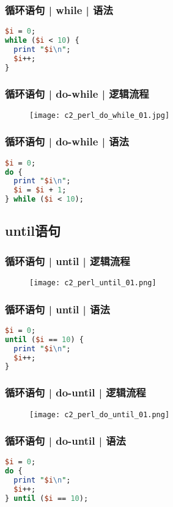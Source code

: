 \begin{frame}[fragile]
  \frametitle{循环语句 | while | \alert{语法}}
\begin{lstlisting}[language=Perl]
$i = 0;
while ($i < 10) {
  print "$i\n";
  $i++;
}
\end{lstlisting}
\end{frame}

\begin{frame}
  \frametitle{循环语句 | do-while | 逻辑流程}
  \begin{figure}
    \centering
    \texttt{[image: c2\_perl\_do\_while\_01.jpg]}
  \end{figure}
\end{frame}

\begin{frame}[fragile]
  \frametitle{循环语句 | do-while | 语法}
\begin{lstlisting}[language=Perl]
$i = 0;
do {
  print "$i\n";
  $i = $i + 1;
} while ($i < 10);
\end{lstlisting}
\end{frame}

\subsection{until语句}
\begin{frame}
  \frametitle{循环语句 | until | 逻辑流程}
  \begin{figure}
    \centering
    \texttt{[image: c2\_perl\_until\_01.png]}
  \end{figure}
\end{frame}

\begin{frame}[fragile]
  \frametitle{循环语句 | until | \alert{语法}}
\begin{lstlisting}[language=Perl]
$i = 0;
until ($i == 10) {
  print "$i\n";
  $i++;
}
\end{lstlisting}
\end{frame}

\begin{frame}
  \frametitle{循环语句 | do-until | 逻辑流程}
  \begin{figure}
    \centering
    \texttt{[image: c2\_perl\_do\_until\_01.png]}
  \end{figure}
\end{frame}

\begin{frame}[fragile]
  \frametitle{循环语句 | do-until | 语法}
\begin{lstlisting}[language=Perl]
$i = 0;
do {
  print "$i\n";
  $i++;
} until ($i == 10);
\end{lstlisting}
\end{frame}

